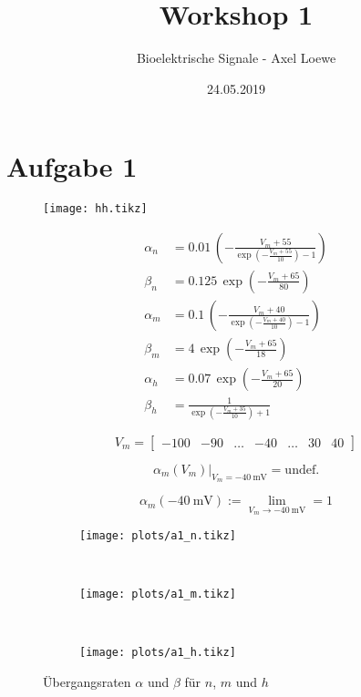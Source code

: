 \documentclass[12pt,a4paper,noendnumber=true]{scrartcl}
\title{Workshop 1}
\subtitle{Bioelektrische Signale - Axel Loewe}
\date{24.05.2019}
\newcommand{\rvect}[1]{\begin{bmatrix} #1 \end{bmatrix}}
\begin{document}
\maketitle

\section{Aufgabe 1}

\begin{figure}[H]
	\centering
	\texttt{[image: hh.tikz]}
\end{figure}

\begin{subequations}
	\begin{align*}
		\alpha_n &= 0.01 \, \left( - \frac{V_m+55}{\exp\left(-\frac{V_m+55}{10}\right)-1} \right)\\
		\beta_n &= 0.125 \, \exp \left( - \frac{V_m+65}{80} \right)\\[3ex]
		\alpha_m &= 0.1 \, \left( - \frac{V_m+40}{\exp(-\frac{V_m+40}{10})-1} \right) \\
		\beta_m &= 4 \, \exp \left( - \frac{V_m+65}{18} \right)\\[3ex]
		\alpha_h &= 0.07 \, \exp \left( - \frac{V_m+65}{20} \right)\\
		\beta_h &= \frac{1}{\exp \left( - \frac{V_m+35}{10} \right)+1}
	\end{align*}
\end{subequations}

\begin{equation*}
	V_m= \rvect{-100 & -90 & \ldots & -40 & \ldots & 30 & 40}
\end{equation*}

\begin{equation*}
	\alpha_m(V_m)\vert_{V_m=\SI{-40}{\milli\volt}} = \text{undef.}
\end{equation*}

\begin{equation*}
	\alpha_m(\SI{-40}{\milli\volt}) := \lim\limits_{V_m \to \SI{-40}{\milli\volt}} = 1
\end{equation*}

\begin{figure}[H]
	\begin{subfigure}[t]{\textwidth}
		\centering
		\texttt{[image: plots/a1\_n.tikz]}
	\end{subfigure}
	\\
	\begin{subfigure}[t]{\textwidth}
		\centering
		\texttt{[image: plots/a1\_m.tikz]}
	\end{subfigure}
	\\
	\begin{subfigure}[t]{\textwidth}
		\centering
		\texttt{[image: plots/a1\_h.tikz]}
	\end{subfigure}
	\caption{Übergangsraten $\alpha$ und $\beta$ für $n$, $m$ und $h$}
\end{figure}
\end{document}
